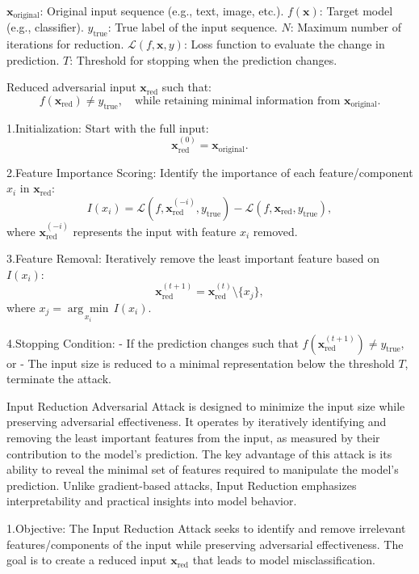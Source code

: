 $\mathbf{x}_{\text{original}}$: Original input sequence (e.g., text, image, etc.).  
$f(\mathbf{x})$: Target model (e.g., classifier).  
$y_{\text{true}}$: True label of the input sequence.  
$N$: Maximum number of iterations for reduction.  
$\mathcal{L}(f, \mathbf{x}, y)$: Loss function to evaluate the change in prediction.  
$T$: Threshold for stopping when the prediction changes.

Reduced adversarial input $\mathbf{x}_{\text{red}}$ such that:  
\[
f(\mathbf{x}_{\text{red}}) \neq y_{\text{true}}, \quad \text{while retaining minimal information from } \mathbf{x}_{\text{original}}.
\]


1.Initialization:  
   Start with the full input:  
   \[
   \mathbf{x}_{\text{red}}^{(0)} = \mathbf{x}_{\text{original}}.
   \]

2.Feature Importance Scoring:  
   Identify the importance of each feature/component $x_i$ in $\mathbf{x}_{\text{red}}$:  
   \[
   I(x_i) = \mathcal{L}(f, \mathbf{x}_{\text{red}}^{(-i)}, y_{\text{true}}) - \mathcal{L}(f, \mathbf{x}_{\text{red}}, y_{\text{true}}),
   \]
   where $\mathbf{x}_{\text{red}}^{(-i)}$ represents the input with feature $x_i$ removed.

3.Feature Removal:  
   Iteratively remove the least important feature based on $I(x_i)$:  
   \[
   \mathbf{x}_{\text{red}}^{(t+1)} = \mathbf{x}_{\text{red}}^{(t)} \setminus \{x_j\},
   \]
   where $x_j = \underset{x_i}{\arg \min} \, I(x_i)$.

4.Stopping Condition:  
   - If the prediction changes such that $f(\mathbf{x}_{\text{red}}^{(t+1)}) \neq y_{\text{true}}$, or  
   - The input size is reduced to a minimal representation below the threshold $T$, terminate the attack.

Input Reduction Adversarial Attack is designed to minimize the input size while preserving adversarial effectiveness. It operates by iteratively identifying and removing the least important features from the input, as measured by their contribution to the model's prediction. The key advantage of this attack is its ability to reveal the minimal set of features required to manipulate the model's prediction. Unlike gradient-based attacks, Input Reduction emphasizes interpretability and practical insights into model behavior.

1.Objective: The Input Reduction Attack seeks to identify and remove irrelevant features/components of the input while preserving adversarial effectiveness. The goal is to create a reduced input $\mathbf{x}_{\text{red}}$ that leads to model misclassification.

